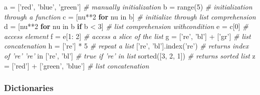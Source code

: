 \documentclass[10pt,a4paperpaper,twocolumn]{article}
\newenvironment{Shaded}{}{}
\newcommand{\DecValTok}[1]{\textcolor[rgb]{0.25,0.63,0.44}{{#1}}}
\newcommand{\StringTok}[1]{\textcolor[rgb]{0.25,0.44,0.63}{{#1}}}
\newcommand{\CommentTok}[1]{\textcolor[rgb]{0.38,0.63,0.69}{\textit{{#1}}}}
\newcommand{\ControlFlowTok}[1]{\textcolor[rgb]{0.00,0.44,0.13}{\textbf{{#1}}}}
\newcommand{\OperatorTok}[1]{\textcolor[rgb]{0.40,0.40,0.40}{{#1}}}
\newcommand{\BuiltInTok}[1]{{#1}}
\newcommand{\NormalTok}[1]{{#1}}
\begin{document}
\begin{Shaded}
\begin{Highlighting}[]
\NormalTok{a }\OperatorTok{=} \NormalTok{[}\StringTok{'red'}\NormalTok{, }\StringTok{'blue'}\NormalTok{, }\StringTok{'green'}\NormalTok{]      }\CommentTok{# manually initialization}
\NormalTok{b }\OperatorTok{=} \BuiltInTok{range}\NormalTok{(}\DecValTok{5}\NormalTok{)                      }\CommentTok{# initialization through a function}
\NormalTok{c }\OperatorTok{=} \NormalTok{[nu}\OperatorTok{**}\DecValTok{2} \ControlFlowTok{for} \NormalTok{nu }\OperatorTok{in} \NormalTok{b]           }\CommentTok{# initialize through list comprehension}
\NormalTok{d }\OperatorTok{=} \NormalTok{[nu}\OperatorTok{**}\DecValTok{2} \ControlFlowTok{for} \NormalTok{nu }\OperatorTok{in} \NormalTok{b }\ControlFlowTok{if} \NormalTok{b }\OperatorTok{<} \DecValTok{3}\NormalTok{]  }\CommentTok{# list comprehension withcondition}
\NormalTok{e }\OperatorTok{=} \NormalTok{c[}\DecValTok{0}\NormalTok{]                          }\CommentTok{# access element}
\NormalTok{f }\OperatorTok{=} \NormalTok{e[}\DecValTok{1}\NormalTok{: }\DecValTok{2}\NormalTok{]                       }\CommentTok{# access a slice of the list}
\NormalTok{g }\OperatorTok{=} \NormalTok{[}\StringTok{'re'}\NormalTok{, }\StringTok{'bl'}\NormalTok{] }\OperatorTok{+} \NormalTok{[}\StringTok{'gr'}\NormalTok{]         }\CommentTok{# list concatenation}
\NormalTok{h }\OperatorTok{=} \NormalTok{[}\StringTok{'re'}\NormalTok{] }\OperatorTok{*} \DecValTok{5}                    \CommentTok{# repeat a list}
\NormalTok{[}\StringTok{'re'}\NormalTok{, }\StringTok{'bl'}\NormalTok{].index(}\StringTok{'re'}\NormalTok{)          }\CommentTok{# returns index of 're'}
\CommentTok{'re'} \OperatorTok{in} \NormalTok{[}\StringTok{'re'}\NormalTok{, }\StringTok{'bl'}\NormalTok{]              }\CommentTok{# true if 're' in list}
\BuiltInTok{sorted}\NormalTok{([}\DecValTok{3}\NormalTok{, }\DecValTok{2}\NormalTok{, }\DecValTok{1}\NormalTok{])                 }\CommentTok{# returns sorted list}
\NormalTok{z }\OperatorTok{=} \NormalTok{[}\StringTok{'red'}\NormalTok{] }\OperatorTok{+} \NormalTok{[}\StringTok{'green'}\NormalTok{, }\StringTok{'blue'}\NormalTok{]   }\CommentTok{# list concatenation}
\end{Highlighting}
\end{Shaded}

\hypertarget{dictionaries}{\subsubsection{Dictionaries}\label{dictionaries}}
\end{document}
